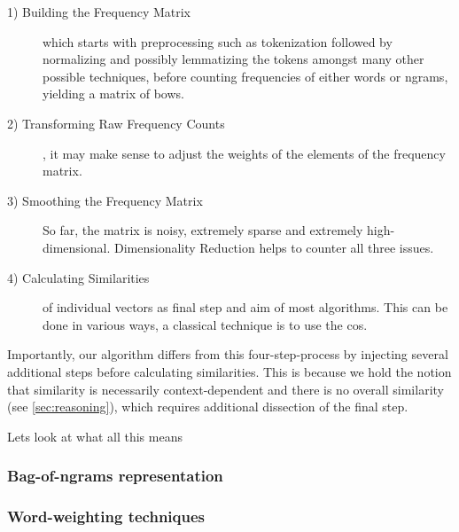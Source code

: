 \begin{description}
    \item[1) Building the Frequency Matrix] which starts with preprocessing such as tokenization followed by normalizing and possibly \gls{lemma}tizing the tokens amongst many other possible techniques, before counting frequencies of either words or \glspl{ngram}, yielding a matrix of \glspl{bow}.
    \item[2) Transforming Raw Frequency Counts]  \cite{Turney2010}, it may make sense to adjust the weights of the elements of the frequency matrix.
    \item[3) Smoothing the Frequency Matrix] So far, the matrix is noisy, extremely sparse and extremely high-dimensional. Dimensionality Reduction helps to counter all three issues.
    \item[4) Calculating Similarities] of individual vectors as final step and aim of most algorithms. This can be done in various ways, a classical technique is to use the \gls{cos}.
\end{description}

Importantly, our algorithm differs from this four-step-process by injecting several additional steps before calculating similarities. This is because we hold the notion that similarity is necessarily context-dependent and there is no overall similarity (see \autoref{sec:reasoning}), which requires additional dissection of the final step.

Lets look at what all this means

\subsubsection{Bag-of-ngrams representation}
\label{sec:techniques:bow}



\subsubsection{Word-weighting techniques}
\label{sec:word_count_techniques}


